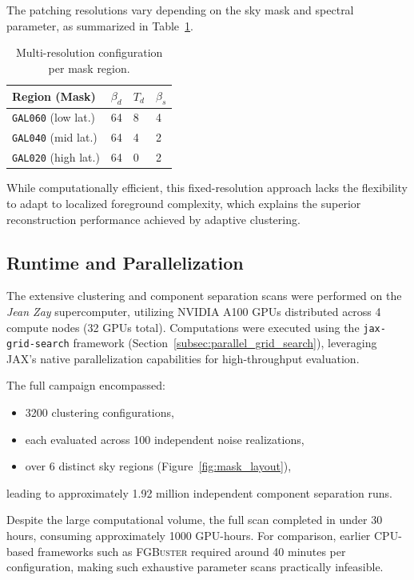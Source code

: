 \documentclass[%
 reprint,
bibnotes,
 amsmath,amssymb,
 aps,
floatfix, 
]{revtex4-2}
\begin{document}
The patching resolutions vary depending on the sky mask and spectral parameter, as summarized in Table~\ref{tab:multires_config}.

\begin{table}[h]
    \centering
    \small
    \caption{Multi-resolution configuration per mask region.}
    \begin{tabular}{@{}p{3.5cm}|p{1.5cm}@{}|p{1.5cm}@{}|p{1.5cm}@{}}
        \toprule
        \textbf{Region (Mask)} & \( \beta_d \) & \( T_d \) & \( \beta_s \) \\
        \midrule
        \texttt{GAL060} (low lat.)  & 64 & 8 & 4 \\
        \texttt{GAL040} (mid lat.)  & 64 & 4 & 2 \\
        \texttt{GAL020} (high lat.) & 64 & 0 & 2 \\
        \bottomrule
    \end{tabular}
    \label{tab:multires_config}
\end{table}

While computationally efficient, this fixed-resolution approach lacks the flexibility to adapt to localized foreground complexity, which explains the superior reconstruction performance achieved by adaptive clustering.

\subsection{Runtime and Parallelization}
\label{subsec:runtime}

The extensive clustering and component separation scans were performed on the \textit{Jean Zay} supercomputer, utilizing NVIDIA A100 GPUs distributed across 4 compute nodes (32 GPUs total). Computations were executed using the \texttt{jax-grid-search} framework (Section~\ref{subsec:parallel_grid_search}), leveraging JAX's native parallelization capabilities for high-throughput evaluation.

The full campaign encompassed:
\begin{itemize}
    \item 3200 clustering configurations,
    \item each evaluated across 100 independent noise realizations,
    \item over 6 distinct sky regions (Figure~\ref{fig:mask_layout}),
\end{itemize}
leading to approximately 1.92 million independent component separation runs.

Despite the large computational volume, the full scan completed in under 30 hours, consuming approximately 1000 GPU-hours. For comparison, earlier CPU-based frameworks such as \textsc{FGBuster} required around 40 minutes per configuration, making such exhaustive parameter scans practically infeasible.
\end{document}
